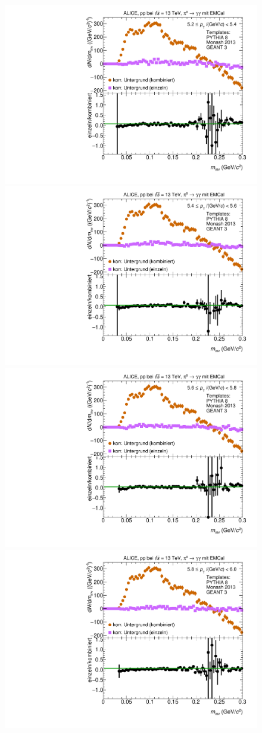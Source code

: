 \begin{figure}[t]
\centering
\begin{multicols}{2}
    \includegraphics[width=.65\linewidth]{Anhang/BackgroundWithRatio20_Data_2016.pdf}\par 
    \includegraphics[width=.65\linewidth]{Anhang/BackgroundWithRatio21_Data_2016.pdf}\par 
\end{multicols}
\begin{multicols}{2}
    \includegraphics[width=.65\linewidth]{Anhang/BackgroundWithRatio22_Data_2016.pdf}\par
    \includegraphics[width=.65\linewidth]{Anhang/BackgroundWithRatio23_Data_2016.pdf}\par

\end{multicols}
\end{figure}
